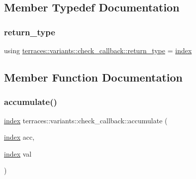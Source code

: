 \subsection{Member Typedef Documentation}
\mbox{\label{classterraces_1_1variants_1_1check__callback_ab5d02c5889d54c20a3e74d104aab9893}} 
\subsubsection{\texorpdfstring{return\+\_\+type}{return\_type}}
{\footnotesize\ttfamily using \hyperlink{classterraces_1_1variants_1_1check__callback_ab5d02c5889d54c20a3e74d104aab9893}{terraces\+::variants\+::check\+\_\+callback\+::return\+\_\+type} =  \hyperlink{namespaceterraces_adbc33ccb543d1634e96d0eb02e472c77}{index}}



\subsection{Member Function Documentation}
\mbox{\label{classterraces_1_1variants_1_1check__callback_ad639ec56d67182da5fa804d8c2fb2670}} 
\subsubsection{\texorpdfstring{accumulate()}{accumulate()}}
{\footnotesize\ttfamily \hyperlink{namespaceterraces_adbc33ccb543d1634e96d0eb02e472c77}{index} terraces\+::variants\+::check\+\_\+callback\+::accumulate (\begin{DoxyParamCaption}\item[{\hyperlink{namespaceterraces_adbc33ccb543d1634e96d0eb02e472c77}{index}}]{acc,  }\item[{\hyperlink{namespaceterraces_adbc33ccb543d1634e96d0eb02e472c77}{index}}]{val }\end{DoxyParamCaption})\hspace{0.3cm}{\ttfamily [inline]}}

